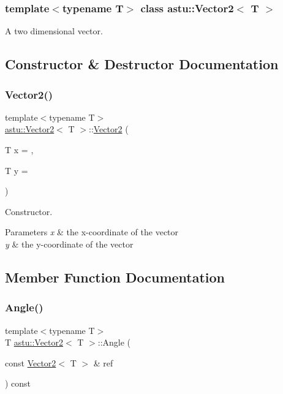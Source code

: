 \subsubsection*{template$<$typename T$>$\newline
class astu\+::\+Vector2$<$ T $>$}

A two dimensional vector. 

\subsection{Constructor \& Destructor Documentation}
\mbox{\label{classastu_1_1Vector2_a021ec0e80fa7ca80921a17172e30fe29}} 
\subsubsection{\texorpdfstring{Vector2()}{Vector2()}}
{\footnotesize\ttfamily template$<$typename T$>$ \\
\hyperlink{classastu_1_1Vector2}{astu\+::\+Vector2}$<$ T $>$\+::\hyperlink{classastu_1_1Vector2}{Vector2} (\begin{DoxyParamCaption}\item[{T}]{x = {},  }\item[{T}]{y = {} }\end{DoxyParamCaption})\hspace{0.3cm}{\ttfamily [inline]}}

Constructor.


\begin{DoxyParams}{Parameters}
{\em x} & the x-\/coordinate of the vector \\
\hline
{\em y} & the y-\/coordinate of the vector \\
\hline
\end{DoxyParams}


\subsection{Member Function Documentation}
\mbox{\label{classastu_1_1Vector2_af44c9648648cb03637f520669e9a2d8e}} 
\subsubsection{\texorpdfstring{Angle()}{Angle()}}
{\footnotesize\ttfamily template$<$typename T$>$ \\
T \hyperlink{classastu_1_1Vector2}{astu\+::\+Vector2}$<$ T $>$\+::Angle (\begin{DoxyParamCaption}\item[{const \hyperlink{classastu_1_1Vector2}{Vector2}$<$ T $>$ \&}]{ref }\end{DoxyParamCaption}) const\hspace{0.3cm}{\ttfamily [inline]}}

